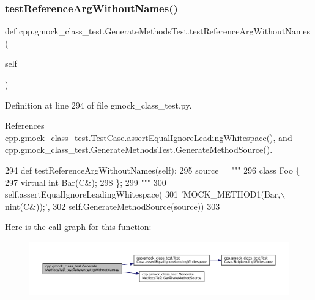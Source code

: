 \subsubsection{\texorpdfstring{test\+Reference\+Arg\+Without\+Names()}{testReferenceArgWithoutNames()}}
{\footnotesize\ttfamily def cpp.\+gmock\+\_\+class\+\_\+test.\+Generate\+Methods\+Test.\+test\+Reference\+Arg\+Without\+Names (\begin{DoxyParamCaption}\item[{}]{self }\end{DoxyParamCaption})}



Definition at line 294 of file gmock\+\_\+class\+\_\+test.\+py.



References cpp.\+gmock\+\_\+class\+\_\+test.\+Test\+Case.\+assert\+Equal\+Ignore\+Leading\+Whitespace(), and cpp.\+gmock\+\_\+class\+\_\+test.\+Generate\+Methods\+Test.\+Generate\+Method\+Source().


\begin{DoxyCode}
294   \textcolor{keyword}{def }testReferenceArgWithoutNames(self):
295     source = \textcolor{stringliteral}{"""}
296 \textcolor{stringliteral}{class Foo \{}
297 \textcolor{stringliteral}{  virtual int Bar(C&);}
298 \textcolor{stringliteral}{\};}
299 \textcolor{stringliteral}{"""}
300     self.assertEqualIgnoreLeadingWhitespace(
301         \textcolor{stringliteral}{'MOCK\_METHOD1(Bar,\(\backslash\)nint(C&));'},
302         self.GenerateMethodSource(source))
303 
\end{DoxyCode}
Here is the call graph for this function\+:
\nopagebreak
\begin{figure}[H]
\begin{center}
\leavevmode
\includegraphics[width=350pt]{classcpp_1_1gmock__class__test_1_1GenerateMethodsTest_af82b50cc3f5daee5f6650fff1323e30c_cgraph}
\end{center}
\end{figure}
\mbox{\label{classcpp_1_1gmock__class__test_1_1GenerateMethodsTest_add445941c6503198f0c3a25e00d20b9f}} 
